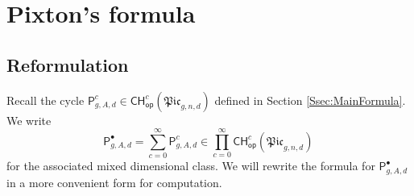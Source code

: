 \documentclass[a4paper,12pt]{article} %
\def\P{\mathsf{P}}
\theoremstyle{definition}
\theoremstyle{plain}%
\newcommand{\Picabs}{\mathfrak{Pic}}
\newcommand{\jocomment}[1]{}
\newcounter{nootje}
\newcommand\todo[1]{[*\thenootje]\marginpar{\tiny\begin{minipage}
{20mm}\begin{flushleft}\thenootje : 
#1\end{flushleft}\end{minipage}}\addtocounter{nootje}{1}}
\begin{document}




\section{Pixton's formula}\label{sec:univeral_pixton}
\subsection{Reformulation}


Recall the cycle $\P_{g,A,d}^{c} \in \mathsf{CH}^c_{\mathsf{op}}(\Picabs_{g,n,d})$
defined in Section \ref{Ssec:MainFormula}. We write
$$\P_{g,A,d}^{\bullet} =\sum_{c=0}^\infty \P_{g,A,d}^{c}
\in \prod_{c=0}^\infty \mathsf{CH}^c_{\mathsf{op}}(\Picabs_{g,n,d})\, $$
for the associated mixed dimensional class.
We will rewrite the formula for $\P_{g,A,d}^{\bullet}$ in a 
more convenient form for computation.
\end{document}

